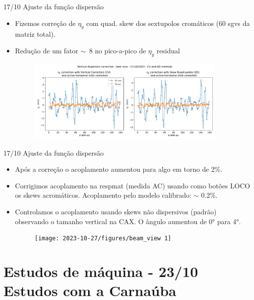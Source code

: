 \documentclass{beamer}					  %
\begin{document}
\begin{frame}{17/10 Ajuste da função dispersão}
    \begin{itemize}
        \item Fizemos correção de $\eta_y$ com quad. skew dos sextupolos cromáticos (60 sgvs da matriz total).
        \item Redução de um fator $\sim$~8 no pico-a-pico de $\eta_y$ residual
    \begin{figure}[H]
		\centering
        \includegraphics[width=0.92\textwidth]{2023-10-27/figures/Vertical_dispersion_correction_with_CV_and_QS_methods_day17 1}
        \label{fig:figure1}
    \end{figure}
	\end{itemize}
\end{frame}

\begin{frame}{17/10 Ajuste da função dispersão}
    \begin{itemize}
        \item Após a correção o acoplamento aumentou para algo em torno de 2\%.
        \item Corrigimos acoplamento na respmat (medida AC) usando como botões LOCO os skews acromáticos. Acoplamento pelo modelo calibrado: $\sim$ 0.2\%.
        \item Controlamos o acoplamento usando skews não dispersivos (padrão) observando o tamanho vertical na CAX. O ângulo aumentou de 0° para 4°.
    \begin{figure}[H]
		\centering
        \texttt{[image: 2023-10-27/figures/beam\_view 1]}
        \label{fig:figure1}
    \end{figure}
	\end{itemize}
\end{frame}



\section{Estudos de máquina - 23/10 Estudos com a Carnaúba}
\end{document}
